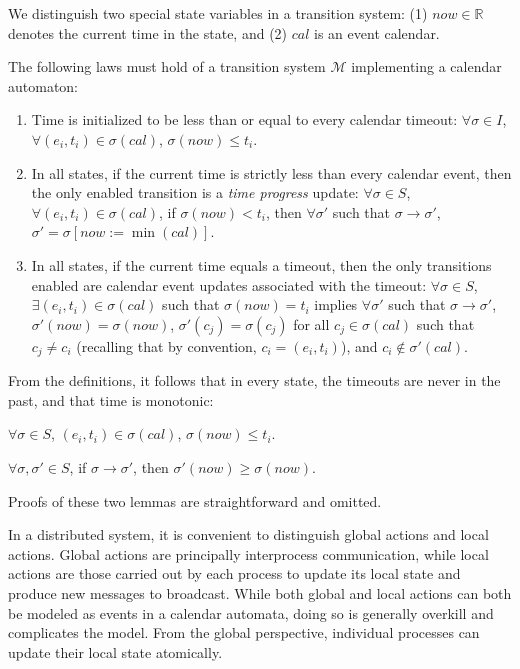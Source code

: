 \documentclass{llncs/llncs}
\begin{document}
We distinguish two special state variables in a transition system: (1) $now \in \mathbb{R}$ denotes the current time in the state, and (2) $cal$ is an event calendar.

The following laws must hold of a transition system $\mathcal{M}$ implementing a calendar automaton:

\begin{enumerate}
\item \label{cal:a} Time is initialized to be less than or equal to every calendar timeout: $\forall \sigma \in I$, $\forall (e_i, t_i) \in \sigma(cal)$, $\sigma(now) \leq t_i$.

\item \label{cal:c} In all states, if the current time is strictly less than every calendar event, then the only enabled transition is a \emph{time progress} update: $\forall \sigma \in S$, $\forall (e_i, t_i) \in \sigma(cal)$, if $\sigma(now) < t_i$, then $\forall \sigma'$ such that $\sigma \rightarrow \sigma'$, $\sigma' = \sigma[now := \min(cal)]$.

\item \label{cal:d} In all states, if the current time equals a timeout, then the only transitions enabled are calendar event updates associated with the timeout: $\forall \sigma \in S$, $\exists (e_i, t_i) \in \sigma(cal)$ such that $\sigma(now) = t_i$ implies $\forall \sigma'$ such that $\sigma \rightarrow \sigma'$, $\sigma'(now) = \sigma(now)$, $\sigma'(c_j) = \sigma(c_j)$ for all $c_j \in \sigma(cal)$ such that $c_j \neq c_i$ (recalling that by convention, $c_i = (e_i, t_i)$), and $c_i \notin \sigma'(cal)$.

\end{enumerate}

From the definitions, it follows that in every state, the timeouts are never in the past, and that time is monotonic:

\begin{lemma}\label{lem:ft}
$\forall \sigma \in S$, $(e_i, t_i) \in \sigma(cal)$, $\sigma(now) \leq t_i$.
\end{lemma}

\begin{lemma}
$\forall \sigma, \sigma' \in S$, if $\sigma \rightarrow \sigma'$, then $\sigma'(now) \geq \sigma(now)$.
\end{lemma}

Proofs of these two lemmas are straightforward and omitted.

In a distributed system, it is convenient to distinguish global actions and local actions. Global actions are principally interprocess communication, while local actions are those carried out by each process to update its local state and produce new messages to broadcast. While both global and local actions can both be modeled as events in a calendar automata, doing so is generally overkill and complicates the model. From the global perspective, individual processes can update their local state atomically.
\end{document}

